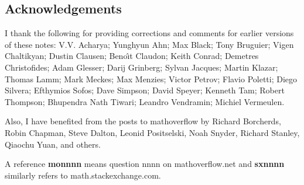 \documentclass[a4paper,11pt,final]{memoir}%
\theoremstyle{nonumberplain}
\begin{document}
\subsection{Acknowledgements}

\bsmall
I thank the following for providing corrections and comments for earlier
versions of these notes: V.V. Acharya; Yunghyun Ahn; Max Black; Tony Bruguier; Vigen
Chaltikyan; Dustin Clausen; Beno\^{\i}t Claudon; Keith Conrad; Demetres
Christofides; Adam Glesser; Darij Grinberg; Sylvan Jacques; Martin Klazar;
Thomas Lamm; Mark Meckes; Max Menzies; Victor Petrov; Flavio Poletti; Diego Silvera;
Efthymios Sofos; Dave Simpson; David Speyer; Kenneth Tam; Robert Thompson;
Bhupendra Nath Tiwari; Leandro Vendramin; Michiel Vermeulen.

Also, I have benefited from the posts to mathoverflow by Richard Borcherds,
Robin Chapman, Steve Dalton, Leonid Positselski, Noah Snyder, Richard Stanley,
Qiaochu Yuan, and others.

A reference \textbf{monnnn} means question nnnn on mathoverflow.net and
\textbf{sxnnnn} similarly refers to math.stackexchange.com. \esmall


\clearpage\thispagestyle{empty} \vspace*{0in}

\bsmall
\end{document}
